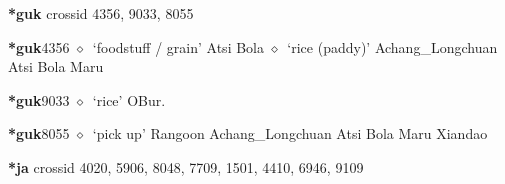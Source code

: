 \item
\textbf{*guk}
  {\tiny crossid 4356, 9033, 8055}
  \begin{list}{}{\leftmargin=1.5em \itemindent=-1.5em}
  \item {\footnotesize \textbf{*guk}}{\tiny 4356}
         $\diamond$~`foodstuff / grain'
         Atsi 
\hspace{1ex}
         Bola 
\hspace{1ex}
         $\diamond$~`rice (paddy)'
         Achang\_Longchuan 
\hspace{1ex}
         Atsi 
\hspace{1ex}
         Bola 
\hspace{1ex}
         Maru 
  \item {\footnotesize \textbf{*guk}}{\tiny 9033}
\hspace{1ex}
         $\diamond$~`rice'
         OBur. 
  \item {\footnotesize \textbf{*guk}}{\tiny 8055}
\hspace{1ex}
         $\diamond$~`pick up'
         Rangoon 
\hspace{1ex}
         Achang\_Longchuan 
\hspace{1ex}
         Atsi 
\hspace{1ex}
         Bola 
\hspace{1ex}
         Maru 
\hspace{1ex}
         Xiandao 
  \end{list}
\item
\textbf{*ja}
  {\tiny crossid 4020, 5906, 8048, 7709, 1501, 4410, 6946, 9109}
